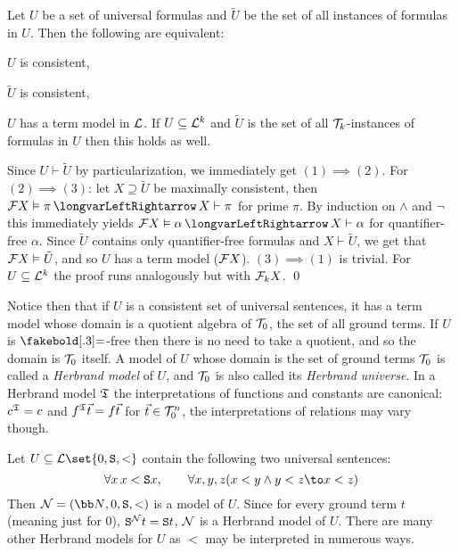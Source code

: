 \bthrm

    Let $U$ be a set of universal formulas and $\tilde U$ be the set of all instances of formulas in $U$.
    Then the following are equivalent:
    \benum
        \item $U$ is consistent,
        \item $\tilde U$ is consistent,
        \item $U$ has a term model in ${\cal L}$.
    \eenum
    If $U\subseteq{\cal L}^k$ and $\tilde U$ is the set of all ${\cal T}_k$-instances of formulas in $U$ then this holds as well.

\ethrm

Since $U\vdash\tilde U$ by particularization, we immediately get $(1)\implies(2)$.
For $(2)\implies(3)$: let $X\supseteq\tilde U$ be maximally consistent, then ${\cal F}X\vDash\pi\iff X\vdash\pi$ for prime $\pi$.
By induction on $\land$ and $\neg$ this immediately yields ${\cal F}X\vDash\alpha\iff X\vdash\alpha$ for quantifier-free $\alpha$.
Since $\tilde U$ contains only quantifier-free formulas and $X\vdash\tilde U$, we get that ${\cal F}X\vDash\tilde U$, and so $U$ has a term model (${\cal F}X$).
$(3)\implies(1)$ is trivial.
For $U\subseteq{\cal L}^k$ the proof runs analogously but with ${\cal F}_kX$.
\qed

Notice then that if $U$ is a consistent set of universal sentences, it has a term model whose domain is a quotient algebra of ${\cal T}_0$, the set of all ground terms.
If $U$ is $\eq$-free then there is no need to take a quotient, and so the domain is ${\cal T}_0$ itself.
A model of $U$ whose domain is the set of ground terms ${\cal T}_0$ is called a {\it Herbrand model} of $U$, and ${\cal T}_0$ is also called its {\it Herbrand universe}.
In a Herbrand model ${\frak T}$ the interpretations of functions and constants are canonical: $c^{\frak T}=c$ and $f^{\frak T}\vec t=f\vec t$ for $\vec t\in{\cal T}_0^n$, the interpretations of relations
may vary though.

\bexam

    Let $U\subseteq{\cal L}\set{0,{\tt S},<}$ contain the following two universal sentences:
    $$ \forall x\,x<{\tt S}x,\qquad \forall x,y,z(x<y\land y<z\to x<z) $$
    Then ${\cal N}=({\bb N},0,{\tt S},<)$ is a model of $U$.
    Since for every ground term $t$ (meaning just for $0$), ${\tt S}^{\cal N}t={\tt S}t$, ${\cal N}$ is a Herbrand model of $U$.
    There are many other Herbrand models for $U$ as $<$ may be interpreted in numerous ways.

